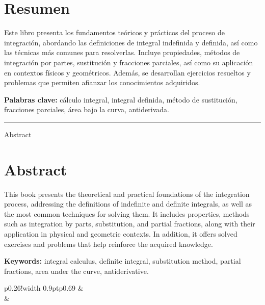 \thispagestyle{empty}
\vspace*{1mm}

\chapter*{Resumen}

Este libro presenta los fundamentos teóricos y prácticos del proceso de integración, abordando las definiciones de integral indefinida y definida, así como las técnicas más comunes para resolverlas. Incluye propiedades, métodos de integración por partes, sustitución y fracciones parciales, así como su aplicación en contextos físicos y geométricos. Además, se desarrollan ejercicios resueltos y problemas que permiten afianzar los conocimientos adquiridos.

\textbf{Palabras clave:} cálculo integral, integral definida, método de sustitución, fracciones parciales, área bajo la curva, antiderivada.

\noindent\rule{1.8cm}{0.4pt}
\vspace{1mm}


{\medseries \large Abstract }
\vspace*{1mm}

\chapter*{Abstract}

This book presents the theoretical and practical foundations of the integration process, addressing the definitions of indefinite and definite integrals, as well as the most common techniques for solving them. It includes properties, methods such as integration by parts, substitution, and partial fractions, along with their application in physical and geometric contexts. In addition, it offers solved exercises and problems that help reinforce the acquired knowledge.

\textbf{Keywords:} integral calculus, definite integral, substitution method, partial fractions, area under the curve, antiderivative.

\vspace{1cm}
\begin{tabular}{p{}!{\vrule width 0.9pt}p{0.69\textwidth}}
	& \hspace{2mm}{\medseries \fontsize{11pt}{9pt}\selectfont{¿Como citar este libro?~/ How to cite this book?}} \\[3.5pt]
	& \hangindent=2mm 
	\fontsize{9pt}{9pt}\selectfont{Zambrano Caviedes, J. y Baquero Torres, E. (2025). Problemas resueltos de integración múltiple con aplicaciones en Wolfram Mathematica. Universidad Distrital Francisco José de Caldas-Editorial UD. DOI: XXXX}\\
\end{tabular}